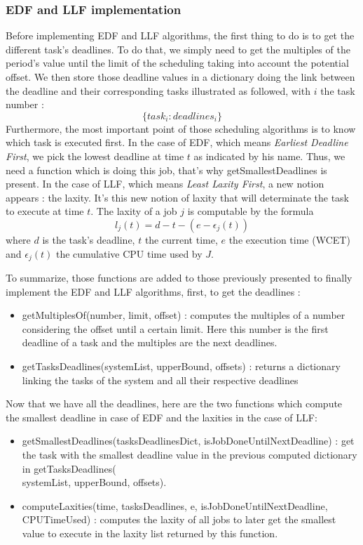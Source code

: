 \documentclass{article}
\begin{document}
\subsubsection{EDF and LLF implementation}
Before implementing EDF and LLF algorithms, the first thing to do is to get the different task's deadlines. To do that, we simply need to get the multiples of the period's value until the limit of the scheduling taking into account the potential offset. We then store those deadline values in a dictionary doing the link between the deadline and their corresponding tasks illustrated as followed, with $i$ the task number :
$$ \{task_{i}:deadlines_{i}\} $$ 
Furthermore, the most important point of those scheduling algorithms is to know which task is executed first. In the case of EDF, which means \textit{Earliest Deadline First}, we pick the lowest deadline at time $t$ as indicated by his name. Thus, we need a function which is doing this job, that's why {\selectfont getSmallestDeadlines} is present. In the case of LLF, which means \textit{Least Laxity First}, a new notion appears : the laxity. It's this new notion of laxity that will determinate the task to execute at time $t$. The laxity of a job $j$ is computable by the formula $$ l_{j}(t) = d - t - ( e - \epsilon_{j}(t)) $$  where $d$ is the task's deadline, $t$ the current time, $e$ the execution time (WCET) and $\epsilon_{j}(t)$ the cumulative CPU time used by $J$.

To summarize, those functions are added to those previously presented to finally implement the EDF and LLF algorithms, first, to get the deadlines : 
\begin{itemize}
    \item {\selectfont getMultiplesOf(number, limit, offset)} :  computes the multiples of a number considering the offset until a certain limit. Here this number is the first deadline of a task and the multiples are the next deadlines. 
    \item {\selectfont getTasksDeadlines(systemList, upperBound, offsets)} :  returns a dictionary linking the tasks of the system and all their respective deadlines
\end{itemize}

Now that we have all the deadlines, here are the two functions which compute the smallest deadline in case of EDF and the laxities in the case of LLF:
\begin{itemize}
    \item {\selectfont getSmallestDeadlines(tasksDeadlinesDict, isJobDoneUntilNextDeadline)} :  get the task with the smallest deadline value in the previous computed dictionary in {\selectfont getTasksDeadlines(\\systemList, upperBound, offsets)}. 
    \item {\selectfont computeLaxities(time, tasksDeadlines, e, isJobDoneUntilNextDeadline, CPUTimeUsed)} : computes the laxity of all jobs to later get the smallest value to execute in the laxity list returned by this function. 
\end{itemize}
\end{document}

